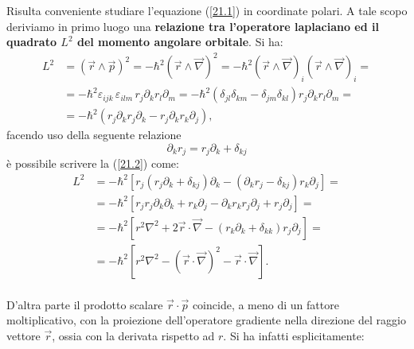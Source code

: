 \documentclass[a4paper,12pt,oneside]{book}
\begin{document}
Risulta conveniente studiare l'equazione (\ref{21.1}) in coordinate polari. A tale scopo deriviamo in primo luogo una \textbf{relazione tra l'operatore laplaciano ed il quadrato $L^2$ del momento angolare orbitale}. Si ha:
	\begin{align} 
	\label{21.2}
		L^2 & = \left(\vec{r}\wedge\vec{p}\right)^2=-\hbar^2\left(\vec{r}\wedge\vec{\nabla}\right)^2=-\hbar^2\left(\vec{r}\wedge\vec{\nabla}\right)_i\left(\vec{r}\wedge\vec{\nabla}\right)_i= \nonumber \\
		 & =  -\hbar^2\varepsilon_{ijk}\,\varepsilon_{ilm}\, r_j\partial_k r_l\partial_m= -\hbar^2\left(\delta_{jl}\delta_{km}-\delta_{jm}\delta_{kl}\right)r_j\partial_k r_l\partial_m=\nonumber \\
		 & =-\hbar^2\left(r_j\partial_kr_j\partial_k-r_j\partial_kr_k\partial_j\right) ,
\end{align}
facendo uso della seguente relazione
	\begin{equation}
		\partial_kr_j=r_j\partial_k+\delta_{kj}
	\end{equation}
è possibile scrivere la (\ref{21.2}) come:
	\begin{align}
	\label{21.3}
		L^2&=-\hbar^2\left[r_j\left(r_j\partial_k+\delta_{kj}\right)\partial_k-\left(\partial_kr_j-\delta_{kj}\right)r_k\partial_j\right]= \nonumber\\
		&=-\hbar^2\left[r_jr_j\partial_k\partial_k+r_k\partial_j-\partial_kr_kr_j\partial_j+r_j\partial_j\right]= \nonumber \\
		&=-\hbar^2\left[r^2\nabla^2+2\vec{r}\cdot\vec{\nabla}-\left(r_k\partial_k+\delta_{kk}\right)r_j\partial_j\right]= \nonumber\\
		&=-\hbar^2\left[r^2\nabla^2-\left(\vec{r}\cdot\vec{\nabla}\right)^2-\vec{r}\cdot\vec{\nabla}\right].
	\end{align}\\
D'altra parte il prodotto scalare $\vec{r}\cdot\vec{p}$ coincide, a meno di un fattore moltiplicativo, con la proiezione dell'operatore gradiente nella direzione del raggio vettore $\vec{r}$, ossia con la derivata rispetto ad $r$. Si ha infatti esplicitamente:
\end{document}
